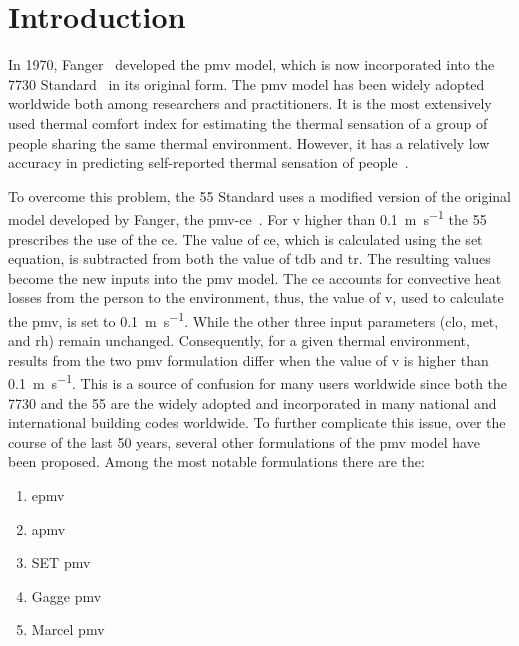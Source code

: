 \section{Introduction}\label{sec:introduction}

In 1970, Fanger~\cite{Fanger1970} developed the \ac{pmv} model, which is now incorporated into the \gls{7730} Standard~\cite{iso7730} in its original form.
The \ac{pmv} model has been widely adopted worldwide both among researchers and practitioners.
It is the most extensively used thermal comfort index for estimating the thermal sensation of a group of people sharing the same thermal environment.
However, it has a relatively low accuracy in predicting self-reported thermal sensation of people~\cite{Cheung2019}.

To overcome this problem, the \gls{55} Standard uses a modified version of the original model developed by Fanger, the \gls{pmv-ce}~\cite{ashrae552020}.
For \ac{v} higher than \qty{0.1}{\m\per\s} the \gls{55} prescribes the use of the \ac{ce}.
The value of \ac{ce}, which is calculated using the \ac{set} equation, is subtracted from both the value of \ac{tdb} and \ac{tr}.
The resulting values become the new inputs into the \ac{pmv} model.
The \ac{ce} accounts for convective heat losses from the person to the environment, thus, the value of \ac{v}, used to calculate the \ac{pmv}, is set to \qty{0.1}{\m\per\s}.
While the other three input parameters (\ac{clo}, \ac{met}, and \ac{rh}) remain unchanged.
Consequently, for a given thermal environment, results from the two \ac{pmv} formulation differ when the value of \ac{v} is higher than \qty{0.1}{\m\per\s}.
This is a source of confusion for many users worldwide since both the \gls{7730} and the \gls{55} are the widely adopted and incorporated in many national and international building codes worldwide.
To further complicate this issue, over the course of the last \num{50} years, several other formulations of the \ac{pmv} model have been proposed.
Among the most notable formulations there are the:
\begin{enumerate}
    \item \gls{epmv}
    \item \gls{apmv}
    \item SET \ac{pmv}
    \item Gagge \ac{pmv}
    \item Marcel \ac{pmv}
\end{enumerate}

